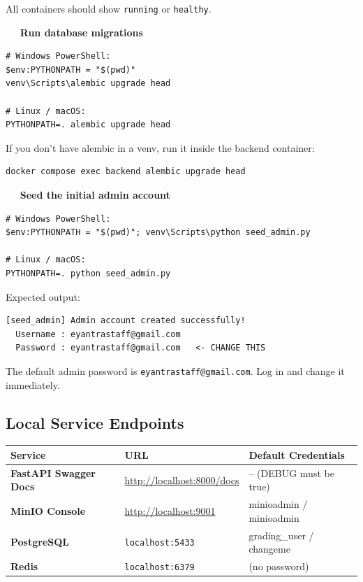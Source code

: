 \documentclass[12pt,a4paper]{article}
\newcounter{stepnum}
\newcommand{\step}[1]{%
  \stepcounter{stepnum}%
  \vspace{8pt}%
  \noindent\colorbox{setupCyan}{\color{white}\bfseries\small\ \thestepnum\ }%
  \hspace{4pt}\textbf{#1}%
  \par\vspace{2pt}%
}
\begin{document}
All containers should show \texttt{running} or \texttt{healthy}.

\step{Run database migrations}
\begin{lstlisting}[style=terminal]
# Windows PowerShell:
$env:PYTHONPATH = "$(pwd)"
venv\Scripts\alembic upgrade head

# Linux / macOS:
PYTHONPATH=. alembic upgrade head
\end{lstlisting}

If you don't have alembic in a venv, run it inside the backend container:
\begin{lstlisting}[style=terminal]
docker compose exec backend alembic upgrade head
\end{lstlisting}

\step{Seed the initial admin account}
\begin{lstlisting}[style=terminal]
# Windows PowerShell:
$env:PYTHONPATH = "$(pwd)"; venv\Scripts\python seed_admin.py

# Linux / macOS:
PYTHONPATH=. python seed_admin.py
\end{lstlisting}

Expected output:
\begin{lstlisting}[style=terminal]
[seed_admin] Admin account created successfully!
  Username : eyantrastaff@gmail.com
  Password : eyantrastaff@gmail.com   <- CHANGE THIS
\end{lstlisting}

\begin{dangerbox}
  The default admin password is \texttt{eyantrastaff@gmail.com}. Log in and change it immediately.
\end{dangerbox}

\subsection{Local Service Endpoints}

\begin{center}
\begin{tabularx}{\linewidth}{>{\bfseries}lll}
\toprule
Service & URL & Default Credentials \\
\midrule
FastAPI Swagger Docs & \url{http://localhost:8000/docs} & -- (DEBUG must be true) \\
MinIO Console        & \url{http://localhost:9001}      & minioadmin / minioadmin \\
PostgreSQL           & \texttt{localhost:5433}           & grading\_user / changeme \\
Redis                & \texttt{localhost:6379}           & (no password) \\
\bottomrule
\end{tabularx}
\end{center}
\end{document}
